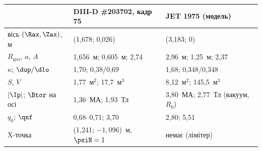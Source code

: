 \begin{cheat}
\small
\begin{tabular}{@{}lll@{}}
& DIII-D \#203702, кадр 75 & JET 1975 (модель)\\\midrule
вісь $(\Rax,\Zax)$, м & (1,678; 0,026) & (3,183; 0)\\
$R_{\mathrm{geo}}$, $a$, $A$ & 1,656~м; 0,605~м; 2,74 & 2,96~м; 1,25~м; 2,37\\
$\kappa$; $\dup/\dlo$ & 1,70; 0,38/0,69 & 1,68; 0,348/0,348\\
$S$, $V$ & 1,77~м$^2$; 17,7~м$^3$ & 8,12~м$^2$; 145,5~м$^3$\\
$|\Ip|$; $\Btor$ на осі & 1,36~МА; 1,93~Тл & 3,80~МА; 2,77~Тл (вакуум, $R_0$)\\
$q_0$; $\qnf$ & 0,68--0,71; 3,70 & 2,80; 5,51\\
X-точка & (1,241; $-1{,}096$)~м, $\psiN=1$ & немає (лімітер)\\
\end{tabular}
\end{cheat}
